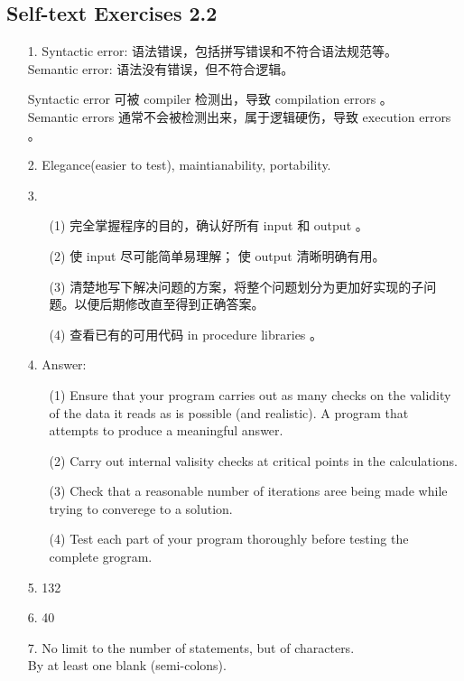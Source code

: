 \documentclass[a4paper,titlepage]{report}
\theoremstyle{definition}
\begin{document}
\subsection*{Self-text Exercises 2.2}

\begin{itemize}
  \item[1.]
  Syntactic error: 语法错误，包括拼写错误和不符合语法规范等。 \\
  Semantic error: 语法没有错误，但不符合逻辑。

  Syntactic error 可被 compiler 检测出，导致 compilation errors 。 \\
  Semantic errors 通常不会被检测出来，属于逻辑硬伤，导致 execution errors 。

  \item[2.]
  Elegance(easier to test), maintianability, portability.

  \item[3.]
  \begin{itemize}
    \item[(1)]
    完全掌握程序的目的，确认好所有 input 和 output 。

    \item[(2)]
    使 input 尽可能简单易理解； 使 output 清晰明确有用。

    \item[(3)]
    清楚地写下解决问题的方案，将整个问题划分为更加好实现的子问题。以便后期修改直至得到正确答案。

    \item[(4)]
    查看已有的可用代码 in procedure libraries 。

  \end{itemize}

  \item[4.]
  Answer:
  \begin{itemize}
    \item[(1)]
    Ensure that your program carries out as many checks on the validity of the data it reads as is possible (and realistic). A program that attempts to produce a meaningful answer.

    \item[(2)]
    Carry out internal valisity checks at critical points in the calculations.

    \item[(3)]
    Check that a reasonable number of iterations aree being made while trying to converege to a solution.

    \item[(4)]
    Test each part of your program thoroughly before testing the complete grogram.

  \end{itemize}

  \item[5.]
  132

  \item[6.]
  40

  \item[7.]
  No limit to the number of statements, but of characters. \\
  By at least one blank (semi-colons).

  \end{itemize}
\end{document}
